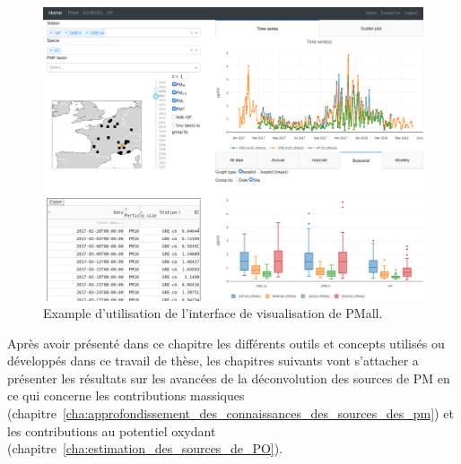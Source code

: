 \begin{figure}[ht]
    \centering
    \includegraphics[width=1.0\linewidth]{figures/chapter02/pmall_example.png}
    \caption{Example d'utilisation de l'interface de visualisation de PMall.}%
    \label{fig:figures/chapter02/pmall_example}
\end{figure}


Après avoir présenté dans ce chapitre les différents outils et concepts utilisés ou
développés dans ce travail de thèse, les chapitres suivants vont s'attacher a présenter
les résultats sur les avancées de la déconvolution des sources de PM en ce qui concerne
les contributions massiques
(chapitre~\ref{cha:approfondissement_des_connaissances_des_sources_des_pm}) et les
contributions au potentiel oxydant (chapitre~\ref{cha:estimation_des_sources_de_PO}).




